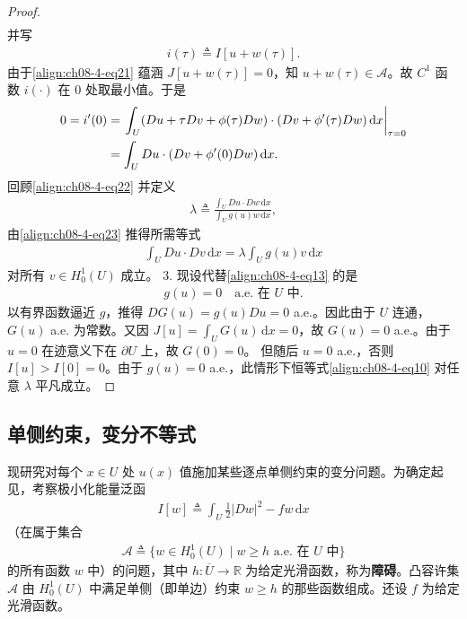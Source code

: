 \documentclass[../../main.tex]{subfiles}
\begin{document}
\begin{theorem}[Lagrange 乘子]
\begin{proof}
\begin{align*}
\end{align*}
并写
\begin{align*}
i(\tau)\triangleq I[u+w(\tau)].
\end{align*}
由于\eqref{align:ch08-4-eq21} 蕴涵 $J[u+w(\tau)]=0$，知 $u+w(\tau)\in\mathcal{A}$。故 $C^1$ 函数 $i(\cdot)$ 在 $0$ 处取最小值。于是
\begin{align}
0=i'(0)&=\left.\int_U(Du+\tau Dv+\phi(\tau)Dw)\cdot(Dv+\phi'(\tau)Dw)\,\mathrm{d}x\right|_{\tau=0}\notag\\
&=\int_U Du\cdot(Dv+\phi'(0)Dw)\,\mathrm{d}x.\label{align:ch08-4-eq23}
\end{align}
回顾\eqref{align:ch08-4-eq22} 并定义
\begin{align*}
\lambda\triangleq\frac{\int_U Du\cdot Dw\,\mathrm{d}x}{\int_U g(u)w\,\mathrm{d}x},
\end{align*}
由\eqref{align:ch08-4-eq23} 推得所需等式
\begin{align*}
\int_U Du\cdot Dv\,\mathrm{d}x=\lambda\int_U g(u)v\,\mathrm{d}x
\end{align*}
对所有 $v\in H_0^1(U)$ 成立。
3. 现设代替\eqref{align:ch08-4-eq13} 的是
\begin{align*}
g(u)=0\quad\text{a.e. 在 }U\text{ 中}.
\end{align*}
以有界函数逼近 $g$，推得 $DG(u)=g(u)Du=0$ a.e.。因此由于 $U$ 连通，$G(u)$ a.e. 为常数。又因 $J[u]=\int_U G(u)\,\mathrm{d}x=0$，故 $G(u)=0$ a.e.。由于 $u=0$ 在迹意义下在 $\partial U$ 上，故 $G(0)=0$。
但随后 $u=0$ a.e.，否则 $I[u]>I[0]=0$。由于 $g(u)=0$ a.e.，此情形下恒等式\eqref{align:ch08-4-eq10} 对任意 $\lambda$ 平凡成立。
\end{proof}
\end{theorem}

\subsection{单侧约束，变分不等式}\label{subsection:ch08-4-2-单侧约束}

现研究对每个 $x\in U$ 处 $u(x)$ 值施加某些逐点单侧约束的变分问题。为确定起见，考察极小化能量泛函
\begin{align}
I[w]\triangleq\int_U\frac12|Dw|^2-fw\,\mathrm{d}x\label{align:ch08-4-eq24}
\end{align}
（在属于集合
\begin{align}
\mathcal{A}\triangleq\{w\in H_0^1(U)\mid w\geqslant h\text{ a.e. 在 }U\text{ 中}\}\label{align:ch08-4-eq25}
\end{align}
的所有函数 $w$ 中）的问题，其中 $h:\overline{U}\to\mathbb{R}$ 为给定光滑函数，称为\textbf{障碍}。凸容许集 $\mathcal{A}$ 由 $H_0^1(U)$ 中满足单侧（即单边）约束 $w\geqslant h$ 的那些函数组成。还设 $f$ 为给定光滑函数。
\end{document}
